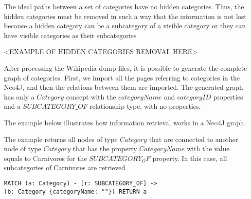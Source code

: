 The ideal paths between a set of categories have no hidden categories. Thus, the hidden categories must be removed in such a way that the information is not lost because a hidden category can be a subcategory of a visible category or they can have visible categories as their subcategories

<EXAMPLE OF HIDDEN CATEGORIES REMOVAL HERE>

After processing the Wikipedia dump files, it is possible to generate the complete graph of categories. First, we import all the pages referring to categories in the Neo4J, and then the relations between them are imported. The generated graph has only a $Category$ concept with the $categoryName$ and $categoryID$ properties and a $SUBCATEGORY\_OF$ relationship type, with no properties.

The example below illustrates how information retrieval works in a Neo4J graph.

The example returns all nodes of type $Category$  that are connected to another node of type $Category$ that has the property $CategoryName$ with the value equals to Carnivores for the $SUBCATEGORY_OF$ property. In this case, all subcategories of Carnivores are retrieved.

\begin{verbatim}
MATCH (a: Category) - [r: SUBCATEGORY_OF] ->
(b: Category {categoryName: ""}) RETURN a
\end{verbatim}





